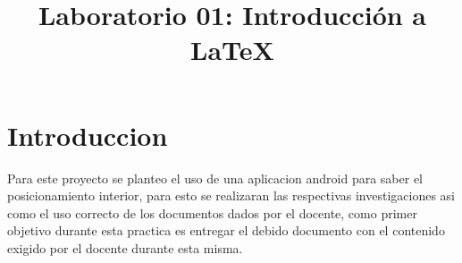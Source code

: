 \documentclass[conference,compsoc,onecolumn]{IEEEtran}
\begin{document}
\title{Laboratorio 01: Introducción a \LaTeX}
\author{
}


\maketitle
\IEEEoverridecommandlockouts
\IEEEpeerreviewmaketitle


\section{Introduccion }
Para  este  proyecto  se  planteo  el  uso  de  una  aplicacion  android  para  saber  el  posicionamiento  interior,  para  esto  se realizaran las respectivas investigaciones asi como el uso correcto de los documentos dados por el docente, como primer objetivo durante esta practica es entregar el debido documento con el contenido exigido por el docente durante esta misma. 
\end{document}
